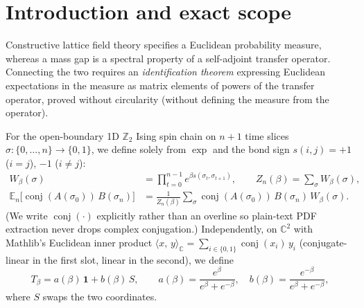 \documentclass[11pt]{article}
\theoremstyle{remark}
\theoremstyle{definition}
\newcommand{\C}{\mathbb{C}}
\newcommand{\Z}{\mathbb{Z}}
\newcommand{\inn}[2]{\langle #1,\, #2\rangle_{\C}}
\newcommand{\Ex}{\mathbb{E}}
\newcommand{\conj}[1]{\operatorname{conj}(#1)}
\begin{document}
\section{Introduction and exact scope}

Constructive lattice field theory specifies a Euclidean probability measure, whereas a
mass gap is a spectral property of a self-adjoint transfer operator. Connecting the two
requires an \emph{identification theorem} expressing Euclidean expectations in the measure
as matrix elements of powers of the transfer operator, proved without circularity (without
defining the measure from the operator).

For the open-boundary 1D $\Z_2$ Ising spin chain on $n+1$ time slices
$\sigma : \{0,\dots,n\} \to \{0,1\}$, we define solely from $\exp$ and the bond sign
$s(i,j) = +1$ ($i=j$), $-1$ ($i \neq j$):
\begin{align*}
  W_\beta(\sigma) &= \prod_{t=0}^{n-1} e^{\beta s(\sigma_t,\sigma_{t+1})},
  \qquad
  Z_n(\beta) = \sum_{\sigma} W_\beta(\sigma), \\
  \Ex_n\bigl[\conj{A(\sigma_0)}\,B(\sigma_n)\bigr]
  &= \frac{1}{Z_n(\beta)}\sum_{\sigma}\conj{A(\sigma_0)}\,B(\sigma_n)\,W_\beta(\sigma).
\end{align*}
(We write $\conj{\cdot}$ explicitly rather than an overline so plain-text PDF extraction
never drops complex conjugation.) Independently, on $\C^2$ with Mathlib's Euclidean inner
product $\inn{x}{y} = \sum_{i\in\{0,1\}} \conj{x_i}\, y_i$ (conjugate-linear in the first
slot, linear in the second), we define
\[
  T_\beta = a(\beta)\,\mathbf{1} + b(\beta)\,S,
  \qquad
  a(\beta) = \frac{e^{\beta}}{e^{\beta}+e^{-\beta}},\quad
  b(\beta) = \frac{e^{-\beta}}{e^{\beta}+e^{-\beta}},
\]
where $S$ swaps the two coordinates.
\end{document}
